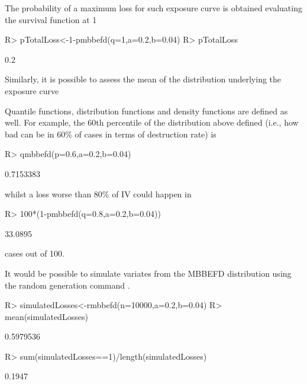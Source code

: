 \documentclass[article, nojss]{jss}
\begin{document}
The probability of a maximum loss for such exposure curve is obtained evaluating the survival function at 1

\begin{Schunk}
\begin{Sinput}
R> pTotalLoss<-1-pmbbefd(q=1,a=0.2,b=0.04)
R> pTotalLoss
\end{Sinput}
\begin{Soutput}
[1] 0.2
\end{Soutput}
\end{Schunk}

Similarly, it is possible to assess the mean of the distribution underlying the exposure curve 


Quantile functions, distribution functions and density functions are defined as well. For example, the 60th percentile of the distribution above defined (i.e., how bad can be in 60\% of cases in terms of destruction rate) is

\begin{Schunk}
\begin{Sinput}
R> qmbbefd(p=0.6,a=0.2,b=0.04)
\end{Sinput}
\begin{Soutput}
[1] 0.7153383
\end{Soutput}
\end{Schunk}

whilst a loss worse than 80\% of IV could happen in 

\begin{Schunk}
\begin{Sinput}
R> 100*(1-pmbbefd(q=0.8,a=0.2,b=0.04))
\end{Sinput}
\begin{Soutput}
[1] 33.0895
\end{Soutput}
\end{Schunk}

cases out of 100.

It would be possible to simulate variates from the MBBEFD distribution using the 
random generation command .

\begin{Schunk}
\begin{Sinput}
R> simulatedLosses<-rmbbefd(n=10000,a=0.2,b=0.04)
R> mean(simulatedLosses)
\end{Sinput}
\begin{Soutput}
[1] 0.5979536
\end{Soutput}
\begin{Sinput}
R> sum(simulatedLosses==1)/length(simulatedLosses)
\end{Sinput}
\begin{Soutput}
[1] 0.1947
\end{Soutput}
\end{Schunk}
\end{document}
